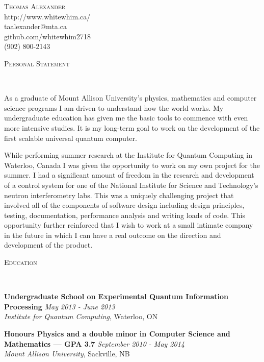 \documentclass[9pt]{article}
\newenvironment{changemargin}[2]{%
  \begin{list}{}{%
    \setlength{\topsep}{0pt}%
    \setlength{\leftmargin}{#1}%
    \setlength{\rightmargin}{#2}%
    \setlength{\listparindent}{\parindent}%
    \setlength{\itemindent}{\parindent}%
    \setlength{\parsep}{\parskip}%
  }%
  \item[]}{\end{list}
}
\newcommand{\lineover}{
	\begin{changemargin}{-0.05in}{-0.05in}
		\vspace*{-8pt}
		\hrulefill \\
		\vspace*{-2pt}
	\end{changemargin}
}
\newcommand{\header}[1]{
	\begin{changemargin}{-0.5in}{-0.5in}
		\scshape{#1}\\
  	\lineover
	\end{changemargin}
}
\newcommand{\contact}[5]{
	\begin{changemargin}{-0.5in}{-0.5in}
		\begin{center}
			{\Large \scshape {#1}}\\ \smallskip
			{#2}\\ \smallskip 
			{#3}\\ \smallskip
			{#5}\\ \smallskip
			{#4}\smallskip
		\end{center}
	\end{changemargin}
}
\newenvironment{body} {
	\vspace*{-16pt}
	\begin{changemargin}{-0.25in}{-0.5in}
  }	
	{\end{changemargin}
}
\begin{document}
\contact{Thomas Alexander}{http://www.whitewhim.ca/}{taalexander@mta.ca}{(902) 800-2143}{github.com/whitewhim2718}


\header{Personal Statement}

\begin{body}
	\vspace{14pt}
	As a graduate of Mount Allison University's physics, mathematics and computer science programs I am driven to understand how the world works. My undergraduate education has given me the basic tools to commence with even more intensive studies. It is my long-term goal to work on the development of the first scalable universal quantum computer.
	 
	While performing summer research at the Institute for Quantum Computing in Waterloo, Canada I was given the opportunity to work on my own project for the summer. I had a significant amount of freedom in the research and development of a control system for one of the National Institute for Science and Technology's neutron interferometry labs. This was a uniquely challenging project that involved all of the components of software design including design principles, testing, documentation, performance analysis and writing loads of code. This opportunity further reinforced that I wish to work at a small intimate company in the future in which I can have a real outcome on the direction and development of the product. 

	
\end{body}

\smallskip


\header{Education}
\begin{body}
	\vspace{14pt}
	\textbf{Undergraduate School on Experimental Quantum Information Processing}{} \hfill \emph{May 2013 - June 2013}{} \\
	\emph{Institute for Quantum Computing}, Waterloo, ON{} \\
  
\end{body}
\begin{body}
	\vspace{14pt}
	\textbf{Honours Physics and a double minor in Computer Science and Mathematics --- GPA 3.7 }{} \hfill \emph{September 2010 - May 2014}{} \\
	\emph{Mount Allison University}, Sackville, NB{} \\
  
\end{body}
\end{document}
